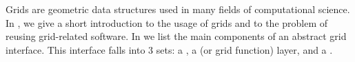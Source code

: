 Grids are geometric data structures used in many fields
of computational science.
In ,
we give a short introduction to the usage of grids
and to the problem of reusing grid-related software.
In 
we list the main components of an abstract grid interface.
This interface falls into 3 sets:
a ,
a  (or grid function) layer,
and a .
